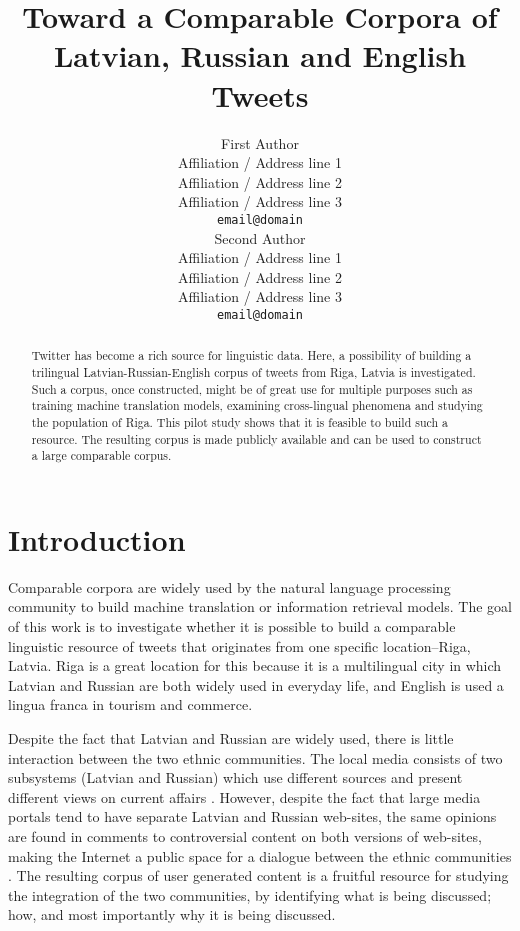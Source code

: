 \documentclass[11pt,a4paper]{article}
\title{Toward a Comparable Corpora of Latvian, Russian and English Tweets}
\author{First Author \\
  Affiliation / Address line 1 \\
  Affiliation / Address line 2 \\
  Affiliation / Address line 3 \\
  {\tt email@domain} \\\And
  Second Author \\
  Affiliation / Address line 1 \\
  Affiliation / Address line 2 \\
  Affiliation / Address line 3 \\
  {\tt email@domain} \\}
\date{}
\begin{document}
\maketitle

\begin{abstract}
Twitter has become a rich source for linguistic data. Here, a possibility of building a trilingual Latvian-Russian-English corpus of tweets from Riga, Latvia is investigated. Such a corpus, once constructed, might be of great use for multiple purposes such as training machine translation models, examining cross-lingual phenomena and studying the population of Riga. This pilot study shows that it is feasible to build such a resource. The resulting corpus is made publicly available and can be used to construct a large comparable corpus.
\end{abstract}

\section{Introduction}
\label{sec:introduction}

Comparable corpora are widely used by the natural language processing community to build machine translation or information retrieval models. The goal of this work is to investigate whether it is possible to build a comparable linguistic resource of tweets that originates from one specific location--Riga, Latvia. Riga is a great location for this because it is a multilingual city in which Latvian and Russian are both widely used in everyday life, and English is used a lingua franca in tourism and commerce.

Despite the fact that Latvian and Russian are widely used, there is little interaction between the two ethnic communities. The local media consists of two subsystems (Latvian and Russian) which use different sources and present different views on current affairs \cite{muiznieks2010}. However, despite the fact that large media portals tend to have separate Latvian and Russian web-sites, the same opinions are found in comments to controversial content on both versions of web-sites, making the Internet a public space for a dialogue  between the ethnic communities \cite{sulmane2010}. The resulting corpus of user generated content is a fruitful resource for studying the integration of the two communities, by identifying what is being discussed; how, and most importantly why it is being discussed.

\end{document}
